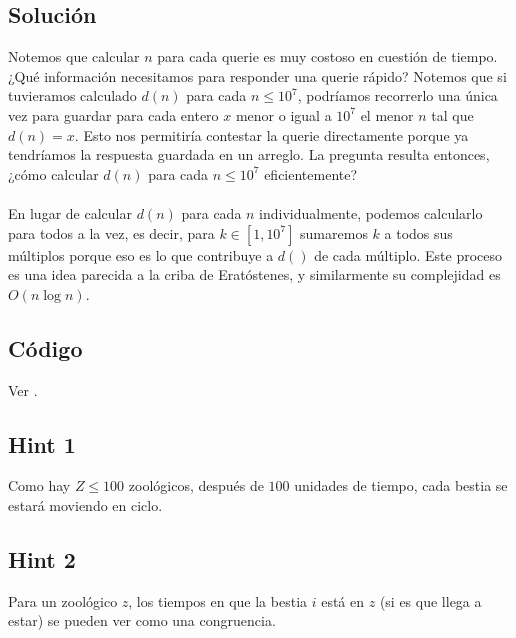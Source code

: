 \subsection*{Solución}
Notemos que calcular $n$ para cada querie es muy costoso en cuestión de tiempo. ¿Qué información necesitamos para responder una querie rápido? Notemos que si tuvieramos calculado $d(n)$ para cada $n\leq 10^7$, podríamos recorrerlo una única vez para guardar para cada entero $x$ menor o igual a $10^7$ el menor $n$ tal que $d(n)=x$. Esto nos permitiría contestar la querie directamente porque ya tendríamos la respuesta guardada en un arreglo. La pregunta resulta entonces, ¿cómo calcular $d(n)$ para cada $n \leq 10^7$ eficientemente?
\\\\
En lugar de calcular $d(n)$ para cada $n$ individualmente, podemos calcularlo para todos a la vez, es decir, para $k \in [1, 10^7]$ sumaremos $k$ a todos sus múltiplos porque eso es lo que contribuye a $d()$ de cada múltiplo. Este proceso es una idea parecida a la criba de Eratóstenes, y similarmente su complejidad es $O(n \log n)$.
\subsection*{Código}
Ver .

\subsection*{Hint 1}
Como hay $Z \leq 100$ zoológicos, después de $100$ unidades de tiempo, cada bestia se estará moviendo en ciclo.
\subsection*{Hint 2}
Para un zoológico $z$, los tiempos en que la bestia $i$
está en $z$ (si es que llega a estar) se pueden ver como una congruencia.
